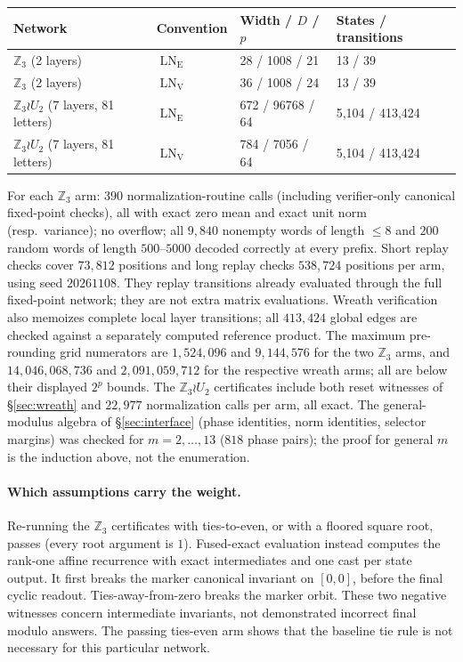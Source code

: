 \documentclass[10pt]{article}
\theoremstyle{remark}
\newcommand{\Z}{\mathbb Z}
\newcommand{\LN}{\operatorname{LN}}
\begin{document}
\begin{center}\small
\begin{tabular}{@{}llll@{}}
\toprule
Network & Convention & Width / $D$ / $p$ & States / transitions \\
\midrule
$\Z_3$ (2 layers) & $\LN_{\mathrm E}$ & 28 / 1008 / 21 & 13 / 39 \\
$\Z_3$ (2 layers) & $\LN_{\mathrm V}$ & 36 / 1008 / 24 & 13 / 39 \\
$\Z_3\wr U_2$ (7 layers, 81 letters) & $\LN_{\mathrm E}$ & 672 / 96768 / 64 & 5{,}104 / 413{,}424 \\
$\Z_3\wr U_2$ (7 layers, 81 letters) & $\LN_{\mathrm V}$ & 784 / 7056 / 64 & 5{,}104 / 413{,}424 \\
\bottomrule
\end{tabular}
\end{center}

For each $\Z_3$ arm: $390$ normalization-routine calls (including
verifier-only canonical fixed-point checks), all with exact zero mean and exact unit norm (resp.\ variance); no overflow; all $9{,}840$ nonempty words of length $\le8$ and $200$ random words of length $500$--$5000$ decoded correctly at every prefix. Short replay checks cover $73{,}812$
positions and long replay checks $538{,}724$ positions per arm, using seed
$20261108$. They replay transitions already evaluated through the full
fixed-point network; they are not extra matrix evaluations. Wreath verification
also memoizes complete local layer transitions; all $413{,}424$ global edges
are checked against a separately computed reference product. The maximum
pre-rounding grid numerators are $1{,}524{,}096$ and $9{,}144{,}576$ for the
two $\Z_3$ arms, and $14{,}046{,}068{,}736$ and $2{,}091{,}059{,}712$ for
the respective wreath arms; all are below their displayed $2^p$ bounds. The $\Z_3\wr U_2$ certificates include both reset witnesses of \S\ref{sec:wreath} and $22{,}977$ normalization calls per arm, all exact. The general-modulus algebra of \S\ref{sec:interface} (phase identities, norm identities, selector margins) was checked for $m=2,\dots,13$ ($818$ phase pairs); the proof for general $m$ is the induction above, not the enumeration.

\paragraph{Which assumptions carry the weight.}
Re-running the $\Z_3$ certificates with ties-to-even, or with a floored square
root, passes (every root argument is $1$). Fused-exact evaluation instead
computes the rank-one affine recurrence with exact intermediates and one cast
per state output. It first breaks the marker canonical invariant on $[0,0]$,
before the final cyclic readout. Ties-away-from-zero breaks the marker orbit.
These two negative witnesses concern intermediate invariants, not demonstrated
incorrect final modulo answers. The passing ties-even arm shows that the
baseline tie rule is not necessary for this particular network.
\end{document}
